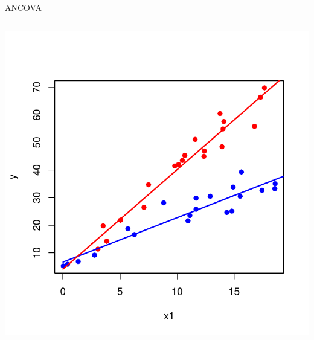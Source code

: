 \documentclass{beamer}\usepackage[]{graphicx}\usepackage[]{color}
\newenvironment{knitrout}{}{} %
\renewenvironment{knitrout}{\setlength{\topsep}{0mm}}{}
\begin{document}
\begin{frame}[fragile]{ANCOVA}
\begin{columns}

\begin{knitrout}
\color{fgcolor}
\includegraphics[width=1.1\linewidth]{figure/ancovplot3-1} 

\end{knitrout}


\end{columns}

\end{frame}
\end{document}
